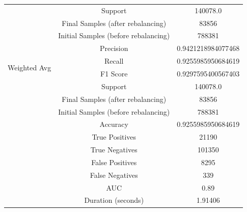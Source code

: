 \begin{longtable}{|c|c|c|}
 & Support & 140078.0 \\
 & Final Samples (after rebalancing) & 83856 \\
 & Initial Samples (before rebalancing) & 788381 \\
\hline
\multirow{4}{*}{Weighted Avg} & Precision & 0.9421218984077468 \\
 & Recall & 0.9255985950684619 \\
 & F1 Score & 0.9297595400567403 \\
 & Support & 140078.0 \\
 & Final Samples (after rebalancing) & 83856 \\
 & Initial Samples (before rebalancing) & 788381 \\
\hline
& Accuracy & 0.9255985950684619 \\ \hline
& True Positives & 21190 \\ \hline
& True Negatives & 101350 \\ \hline
& False Positives & 8295 \\ \hline
& False Negatives & 339 \\ \hline
& AUC & 0.89 \\ \hline
& Duration (seconds) & 1.91406 \\ \hline
\end{longtable}


